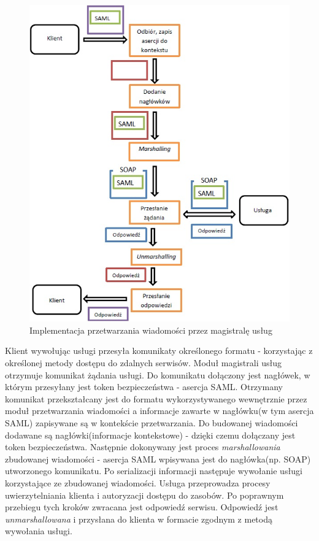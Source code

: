 	\begin{figure}[h]
		\centering
		\includegraphics{img/esbRoute.jpg}
		\caption{Implementacja przetwarzania wiadomości przez magistralę usług}
		\label{ESB route}
	\end{figure}

	Klient wywołując usługi przesyła komunikaty określonego formatu - korzystając z określonej metody dostępu do zdalnych serwisów. Moduł magistrali usług otrzymuje komunikat żądania usługi. Do komunikatu dołączony jest nagłówek, w którym przesyłany jest token bezpieczeństwa - asercja SAML. Otrzymany komunikat przekształcany jest do formatu wykorzystywanego wewnętrznie przez moduł przetwarzania wiadomości a informacje zawarte w nagłówku(w tym asercja SAML) zapisywane są w kontekście przetwarzania. Do budowanej wiadomości dodawane są nagłówki(informacje kontekstowe) - dzięki czemu dołączany jest token bezpieczeństwa. Następnie dokonywany jest proces \textit{marshallowania} zbudowanej wiadomości - asercja SAML wpisywana jest do nagłówka(np. SOAP) utworzonego komunikatu. Po serializacji informacji następuje wywołanie usługi korzystające ze zbudowanej wiadomości. Usługa przeprowadza procesy uwierzytelniania klienta i autoryzacji dostępu do zasobów. Po poprawnym przebiegu tych kroków zwracana jest odpowiedź serwisu. Odpowiedź jest \textit{unmarshallowana} i przysłana do klienta w formacie zgodnym z metodą wywołania usługi.
	

